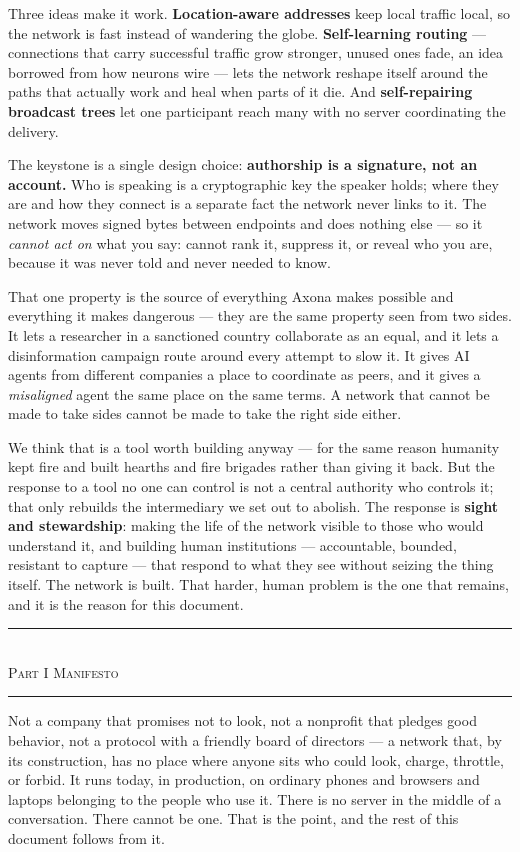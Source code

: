 \documentclass[nobib,justified]{tufte-handout}
\newcommand{\manpart}[1]{%
  \needspace{8\baselineskip}%
  \begin{center}%
  \vspace{1.2em}%
  {\color{rust}\rule{3em}{0.8pt}}\\[0.7em]%
  {\scshape\large #1}\\[0.4em]%
  {\color{rust}\rule{3em}{0.8pt}}%
  \vspace{0.9em}%
  \end{center}}
\begin{document}
Three ideas make it work. \textbf{Location-aware addresses} keep local
traffic local, so the network is fast instead of wandering the globe.
\textbf{Self-learning routing} --- connections that carry successful traffic
grow stronger, unused ones fade, an idea borrowed from how neurons wire ---
lets the network reshape itself around the paths that actually work and heal
when parts of it die. And \textbf{self-repairing broadcast trees} let one
participant reach many with no server coordinating the delivery.

The keystone is a single design choice: \textbf{authorship is a signature,
not an account.} Who is speaking is a cryptographic key the speaker holds;
where they are and how they connect is a separate fact the network never
links to it. The network moves signed bytes between endpoints and does
nothing else --- so it \emph{cannot act on} what you say: cannot rank it,
suppress it, or reveal who you are, because it was never told and never
needed to know.

That one property is the source of everything Axona makes possible and
everything it makes dangerous --- they are the same property seen from two
sides. It lets a researcher in a sanctioned country collaborate as an equal,
and it lets a disinformation campaign route around every attempt to slow it.
It gives AI agents from different companies a place to coordinate as peers,
and it gives a \emph{misaligned} agent the same place on the same terms. A
network that cannot be made to take sides cannot be made to take the right
side either.

We think that is a tool worth building anyway --- for the same reason
humanity kept fire and built hearths and fire brigades rather than giving it
back. But the response to a tool no one can control is not a central
authority who controls it; that only rebuilds the intermediary we set out to
abolish. The response is \textbf{sight and stewardship}: making the life of
the network visible to those who would understand it, and building human
institutions --- accountable, bounded, resistant to capture --- that respond
to what they see without seizing the thing itself. The network is built. That
harder, human problem is the one that remains, and it is the reason for this
document.

\newpage
\manpart{Part I \;\textbullet\; Manifesto}

 Not a company that promises not
to look, not a nonprofit that pledges good behavior, not a protocol with a
friendly board of directors --- a network that, by its construction, has no
place where anyone sits who could look, charge, throttle, or forbid. It runs today, in production, on ordinary phones and browsers and laptops
belonging to the people who use it. There is no server in the middle
of a conversation. There cannot be one. That is the point, and the rest of
this document follows from it.
\end{document}

